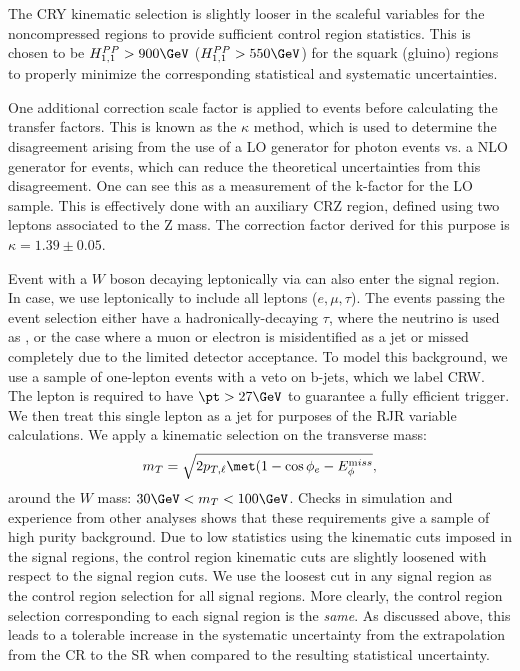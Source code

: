 The CRY kinematic selection is slightly looser in the scaleful variables for the noncompressed regions to provide sufficient control region statistics.
This is chosen to be $\HFnm{PP}{1}{1} > 900 \GeV$ ($\HFnm{PP}{1}{1} > 550 \GeV$) for the squark (gluino) regions to properly minimize the corresponding statistical and systematic uncertainties.
\begin{figure}
\caption{} \label{fig:boson_pt_ratio}
\end{figure}

One additional correction scale factor is applied to \gammajets events before calculating the transfer factors.
This is known as the $\kappa$ method, which is used to determine the disagreement arising from the use of a LO generator for photon events vs. a NLO generator for \zjets events, which can reduce the theoretical uncertainties from this disagreement. 
One can see this as a measurement of the k-factor for the LO \gammajets sample.
This is effectively done with an auxiliary CRZ region, defined using two leptons associated to the Z mass.
The correction factor derived for this purpose is $\kappa = 1.39 \pm 0.05$.

Event with a $W$ boson decaying leptonically via \wln can also enter the signal region.
In case, we use leptonically to include all leptons ($e,\mu,\tau$).
The \wjets events passing the event selection either have a hadronically-decaying $\tau$, where the neutrino is used as \met, or the case where a muon or electron is misidentified as a jet or missed completely due to the limited detector acceptance.
To model this background, we use a sample of one-lepton events with a veto on b-jets, which we label CRW.
The lepton is required to have $\pt > 27 \GeV$ to guarantee a fully efficient trigger.
We then treat this single lepton as a jet for purposes of the RJR variable calculations.
We apply a kinematic selection on the transverse mass:
\begin{align}
m_T = \sqrt{2p_{T,\ell} \met ( 1 - \cos{ \phi_{e} - \metphi } },
\end{align}
around the $W$ mass: $30 \GeV < m_T < 100 \GeV$.
Checks in simulation and experience from other analyses shows that these requirements give a sample of high purity \wln background.
Due to low statistics using the kinematic cuts imposed in the signal regions, the control region kinematic cuts are slightly loosened with respect to the signal region cuts.
We use the loosest cut in any signal region as the control region selection for all signal regions.
More clearly, the control region selection corresponding to each signal region is the \textit{same}.
As discussed above, this leads to a tolerable increase in the systematic uncertainty from the extrapolation from the CR to the SR when compared to the resulting statistical uncertainty.

